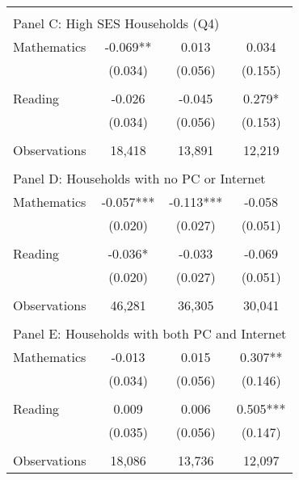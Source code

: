 {\begin{tabular}{lccc}
&  &  &   \\
\multicolumn{4}{l}{Panel C: High SES Households (Q4)} \\
\hspace{3mm}Mathematics&      -0.069** &       0.013   &       0.034   \\
                    &     (0.034)   &     (0.056)   &     (0.155)   \\
 
&  &  &   \\
\hspace{3mm}Reading &      -0.026   &      -0.045   &       0.279*  \\
                    &     (0.034)   &     (0.056)   &     (0.153)   \\
                    &               &               &               \\
\hspace{3mm}Observations&      18,418   &      13,891   &      12,219   \\
 
&  &  &   \\
\multicolumn{4}{l}{Panel D: Households with no PC or Internet} \\
\hspace{3mm}Mathematics&      -0.057***&      -0.113***&      -0.058   \\
                    &     (0.020)   &     (0.027)   &     (0.051)   \\
 
&  &  &   \\
\hspace{3mm}Reading &      -0.036*  &      -0.033   &      -0.069   \\
                    &     (0.020)   &     (0.027)   &     (0.051)   \\
                    &               &               &               \\
\hspace{3mm}Observations&      46,281   &      36,305   &      30,041   \\
 
&  &  &   \\
\multicolumn{4}{l}{Panel E: Households with both PC and Internet} \\
\hspace{3mm}Mathematics&      -0.013   &       0.015   &       0.307** \\
                    &     (0.034)   &     (0.056)   &     (0.146)   \\
 
&  &  &   \\
\hspace{3mm}Reading &       0.009   &       0.006   &       0.505***\\
                    &     (0.035)   &     (0.056)   &     (0.147)   \\
                    &               &               &               \\
\hspace{3mm}Observations&      18,086   &      13,736   &      12,097   \\
 

\bottomrule
\end{tabular}
}
